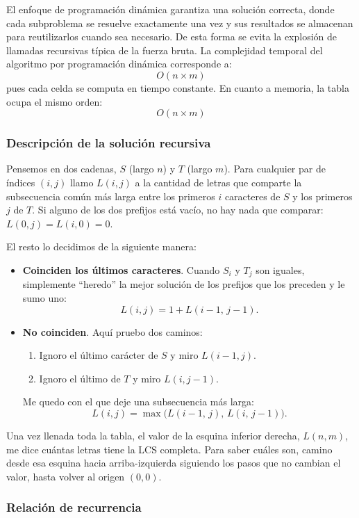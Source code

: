 
El enfoque de programación dinámica garantiza una solución correcta, donde cada subproblema se resuelve exactamente una vez y sus resultados se almacenan para reutilizarlos cuando sea necesario. De esta forma se evita la explosión de llamadas recursivas típica de la fuerza bruta. La complejidad temporal del algoritmo por programación dinámica corresponde a: \[O{(n \times m)}\] pues cada celda se computa en tiempo constante. En cuanto a memoria, la tabla ocupa el mismo orden: \[O{(n \times m)}\]

\subsubsection{Descripción de la solución recursiva}

Pensemos en dos cadenas, $S$ (largo $n$) y $T$ (largo $m$).
Para cualquier par de índices $(i,j)$ llamo $L(i,j)$ a la cantidad de letras que comparte la subsecuencia común más larga entre los primeros $i$ caracteres de $S$ y los primeros $j$ de $T$. Si alguno de los dos prefijos está vacío, no hay nada que comparar: $L(0,j)=L(i,0)=0$.

El resto lo decidimos de la siguiente manera:

\begin{itemize}
  \item \textbf{Coinciden los últimos caracteres}.  
        Cuando $S_i$ y $T_j$ son iguales, simplemente
        “heredo” la mejor solución de los prefijos que los preceden y
        le sumo uno:
        \[L(i,j) = 1 + L(i-1,\,j-1).\]
  \item \textbf{No coinciden}.  
        Aquí pruebo dos caminos:  
        \begin{enumerate}
          \item Ignoro el último carácter de $S$ y miro $L(i-1,j)$.
          \item Ignoro el último de $T$ y miro $L(i,j-1)$.
        \end{enumerate}
        Me quedo con el que deje una subsecuencia más larga:
        \[L(i,j) = \max\!\bigl(L(i-1,\,j),\,L(i,\,j-1)\bigr).\]
\end{itemize}

Una vez llenada toda la tabla, el valor de la esquina inferior derecha,
$L(n,m)$, me dice cuántas letras tiene la LCS completa.
Para saber cuáles son, camino desde esa esquina hacia arriba-izquierda siguiendo los pasos que no cambian el valor, hasta volver al origen $(0,0)$.

\subsubsection{Relación de recurrencia}

